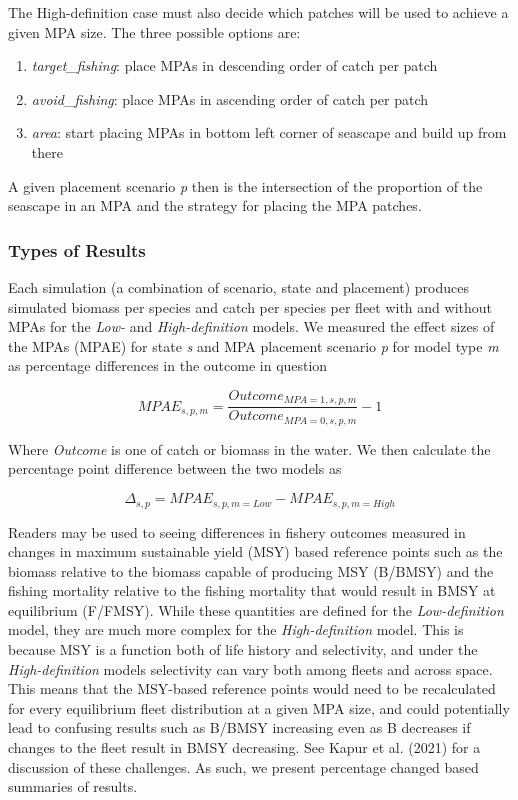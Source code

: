 \documentclass[
  default,
  lineno,
  referee]{sn-jnl}
\providecommand{\tightlist}{%
  \setlength{\itemsep}{0pt}\setlength{\parskip}{0pt}}\usepackage{longtable,booktabs,array}
\begin{document}
The High-definition case must also decide which patches will be used to
achieve a given MPA size. The three possible options are:

\begin{enumerate}
\def\labelenumi{\arabic{enumi}.}
\tightlist
\item
  \emph{target\_fishing}: place MPAs in descending order of catch per
  patch
\item
  \emph{avoid\_fishing}: place MPAs in ascending order of catch per
  patch
\item
  \emph{area}: start placing MPAs in bottom left corner of seascape and
  build up from there
\end{enumerate}

A given placement scenario \emph{p} then is the intersection of the
proportion of the seascape in an MPA and the strategy for placing the
MPA patches.

\subsubsection{Types of Results}\label{types-of-results}

Each simulation (a combination of scenario, state and placement)
produces simulated biomass per species and catch per species per fleet
with and without MPAs for the \emph{Low-} and \emph{High-definition}
models. We measured the effect sizes of the MPAs (MPAE) for state
\emph{s} and MPA placement scenario \emph{p} for model type \emph{m} as
percentage differences in the outcome in question

\[
MPAE_{s,p,m} = \frac{Outcome_{MPA=1,s,p,m}}{Outcome_{MPA=0,s,p,m}} -1 
\]

Where \emph{Outcome} is one of catch or biomass in the water. We then
calculate the percentage point difference between the two models as

\[
\Delta_{s,p} = MPAE_{s,p,m=Low} - MPAE_{s,p,m=High}
\]

Readers may be used to seeing differences in fishery outcomes measured
in changes in maximum sustainable yield (MSY) based reference points
such as the biomass relative to the biomass capable of producing MSY
(B/BMSY) and the fishing mortality relative to the fishing mortality
that would result in BMSY at equilibrium (F/FMSY). While these
quantities are defined for the \emph{Low-definition} model, they are
much more complex for the \emph{High-definition} model. This is because
MSY is a function both of life history and selectivity, and under the
\emph{High-definition} models selectivity can vary both among fleets and
across space. This means that the MSY-based reference points would need
to be recalculated for every equilibrium fleet distribution at a given
MPA size, and could potentially lead to confusing results such as B/BMSY
increasing even as B decreases if changes to the fleet result in BMSY
decreasing. See Kapur et al. (2021) for a discussion of these
challenges. As such, we present percentage changed based summaries of
results.
\end{document}
